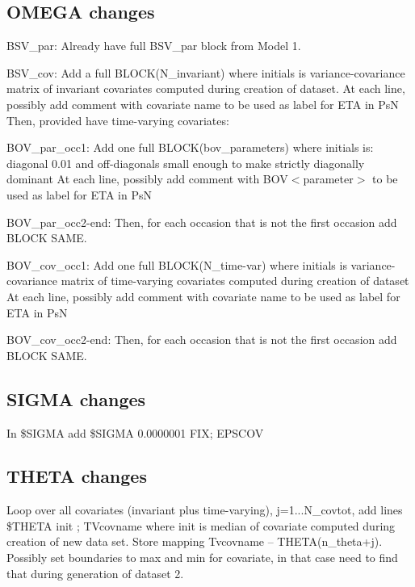 \subsection{OMEGA changes}
BSV\_par: Already have full BSV\_par block from Model 1.

BSV\_cov: Add a full BLOCK(N\_invariant) where initials is variance-covariance matrix of invariant covariates computed during creation of dataset.
At each line, possibly add comment with covariate name to be used as label for ETA in PsN
Then, provided have time-varying covariates:

BOV\_par\_occ1: Add one full BLOCK(bov\_parameters) where initials is: diagonal 0.01 and off-diagonals small enough to make strictly diagonally dominant
At each line, possibly add comment with BOV$<$parameter$>$ to be used as label for ETA in PsN

BOV\_par\_occ2-end: Then, for each occasion that is not the first occasion add BLOCK SAME.

BOV\_cov\_occ1: Add one full BLOCK(N\_time-var) where initials is variance-covariance matrix of time-varying covariates computed during creation of dataset
At each line, possibly add comment with covariate name to be used as label for ETA in PsN

BOV\_cov\_occ2-end: Then, for each occasion that is not the first occasion add BLOCK SAME.

\subsection{SIGMA changes}
In \$SIGMA add 
\$SIGMA 0.0000001 FIX; EPSCOV

\subsection{THETA changes}
Loop over all covariates (invariant plus time-varying), j=1...N\_covtot, add lines
\$THETA init ; TVcovname
where init is median of covariate computed during creation of new data set. Store mapping Tvcovname – THETA(n\_theta+j). Possibly set boundaries to max and min for covariate, in that case need to find that during generation of dataset 2.

